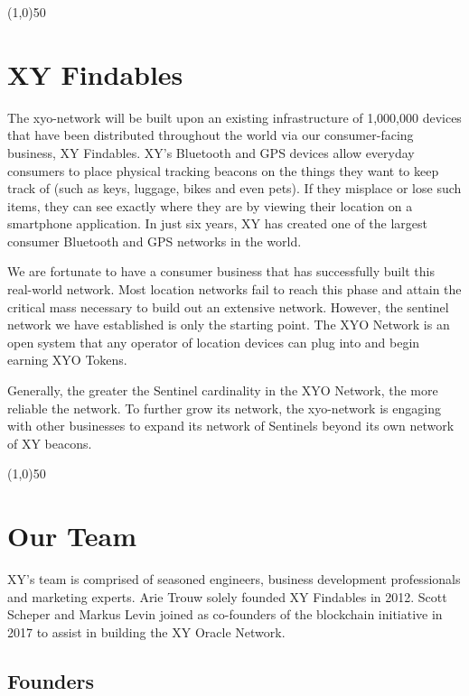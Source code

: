 \documentclass{article}
\begin{document}
\begin{center}
\line(1,0){50}
\end{center}

\section{XY Findables}

The \Gls{xyo-network} will be built upon an existing infrastructure of 1,000,000 devices that have been distributed throughout the world via our consumer-facing business, XY Findables. XY's Bluetooth and GPS devices allow everyday consumers to place physical tracking beacons on the things they want to keep track of (such as keys, luggage, bikes and even pets). If they misplace or lose such items, they can see exactly where they are by viewing their location on a smartphone application. In just six years, XY has created one of the largest consumer Bluetooth and GPS networks in the world.

We are fortunate to have a consumer business that has successfully built this real-world network. Most location networks fail to reach this phase and attain the critical mass necessary to build out an extensive network. However, the \Gls{sentinel} network we have established is only the starting point. The XYO Network is an open system that any operator of location devices can plug into and begin earning XYO Tokens.

Generally, the greater the Sentinel cardinality in the XYO Network, the more reliable the network. To further grow its network, the \Gls{xyo-network} is engaging with other businesses to expand its network of Sentinels beyond its own network of XY beacons.

\begin{center}
\line(1,0){50}
\end{center}

\section{Our Team}
XY's team is comprised of seasoned engineers, business development professionals and marketing experts. Arie Trouw solely founded XY Findables in 2012. Scott Scheper and Markus Levin joined as co-founders of the blockchain initiative in 2017 to assist in building the XY Oracle Network.

\subsection{Founders}
\end{document}
